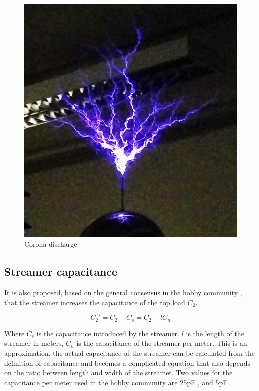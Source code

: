 \begin{figure}[H]
    \centering
    \includegraphics[height=0.4\textheight]{img/foto/Corona.jpg}
    \caption{Corona discharge}
    \label{fig:foto:corona}
\end{figure}

\subsection{Streamer capacitance}
It is also proposed, based on the general consensus in the hobby community \citep{streamercapacitance}, that the streamer increases the capacitance of the top load $C_2$.

\begin{equation}
    C_2' = C_2 + C_s = C_2 + l C_u
\end{equation}

Where $C_s$ is the capacitance introduced by the streamer. $l$ is the length of the streamer in meters, $C_u$ is the capacitance of the streamer per meter. This is an approximation, the actual capacitance of the streamer can be calculated from the definition of capacitance and becomes a complicated equation that also depends on the ratio between length and width of the streamer. Two values for the capacitance per meter used in the hobby community are 25pF \citep{conner}, and 5pF \citep{scantesla}.

